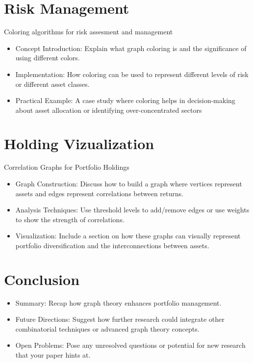 \documentclass{article}
\begin{document}
\section{Risk Management}
Coloring algorithms for risk assesment and management

\begin{itemize}
    \item Concept Introduction: Explain what graph coloring is and the significance of using different colors.
    \item Implementation: How coloring can be used to represent different levels of risk or different asset classes.
    \item Practical Example: A case study where coloring helps in decision-making about asset allocation or identifying over-concentrated sectors
\end{itemize}


\section{Holding Vizualization}

Correlation Graphs for Portfolio Holdings

\begin{itemize}
    \item Graph Construction: Discuss how to build a graph where vertices represent assets and edges represent correlations between returns.
    \item Analysis Techniques: Use threshold levels to add/remove edges or use weights to show the strength of correlations.
    \item Visualization: Include a section on how these graphs can visually represent portfolio diversification and the interconnections between assets.
\end{itemize}


\section{Conclusion}

\begin{itemize}
    \item Summary: Recap how graph theory enhances portfolio management.
    \item Future Directions: Suggest how further research could integrate other combinatorial techniques or advanced graph theory concepts.
    \item Open Problems: Pose any unresolved questions or potential for new research that your paper hints at.
\end{itemize}
\end{document}
